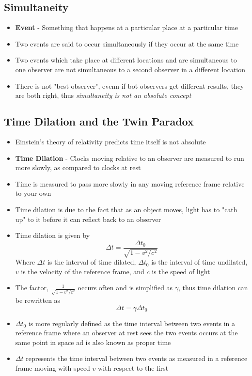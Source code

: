 \subsection{Simultaneity}
\begin{itemize}
    \item \textbf{Event} - Something that happens at a particular place at a particular time
    \item Two events are said to occur simultaneously if they occur at the same time 
    \item Two events which take place at different locations and are simultaneous to one observer are not simultaneous to a second observer in a different location
    \item There is not "best observer", evenn if bot observers get different results, they are both right, thus \emph{simultaneity is not an absolute concept}
\end{itemize}

\subsection{Time Dilation and the Twin Paradox}
\begin{itemize}
    \item Einstein's theory of relativity predicts time itself is not absolute
    \item \textbf{Time Dilation} - Clocks moving relative to an observer are measured to run more slowly, as compared to clocks at rest
    \item Time is measured to pass more slowly in any moving reference frame relative to your own
    \item Time dilation is due to the fact that as an object moves, light has to "cath up" to it before it can reflect back to an observer
    \item Time dilation is given by \[\Delta t=\frac{\Delta t_0}{\sqrt{1-v^2/c^2}}\] Where \(\Delta t\) is the interval of time dilated, \(\Delta t_0\) is the interval of time undilated, \(v\) is the velocity of the reference frame, and \(c\) is the speed of light
    \item The factor, \(\frac{1}{\sqrt{1-v^2/c^2}}\) occurs often and is simplified as \(\gamma\), thus time dilation can be rewritten as \[\Delta t=\gamma\Delta t_0\]
    \item \(\Delta t_0\) is more regularly defined as the time interval between two events in a reference frame where an observer at rest sees the two events occurs at the same point in space ad is also known as proper time
    \item \(\Delta t\) represents the time interval between two events as measured in a reference frame moving with speed \(v\) with respect to the first
\end{itemize}

